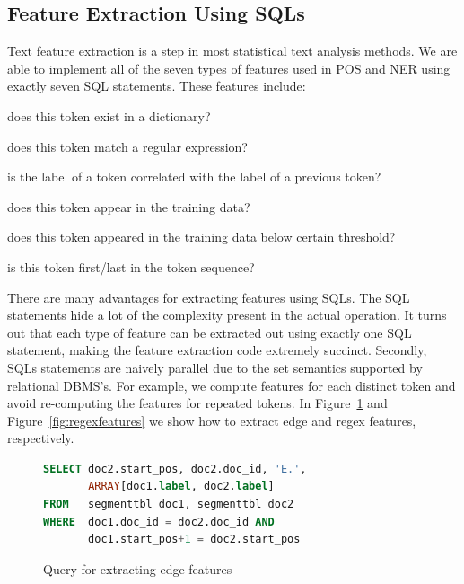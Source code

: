 \documentclass[11pt,letterpaper]{article}
\begin{document}
\subsection{Feature Extraction Using SQLs}
Text feature extraction is a step in most statistical text analysis methods.
We are able to implement all of the seven types of features used in POS and NER using exactly seven 
SQL statements. These features include: 
\begin{description}[noitemsep]
\item[Dictionary:] does this token exist in a dictionary? 
\item[Regex:] does this token match a regular expression? 
\item[Edge:] is the label of a token correlated with the label of a previous token? 
\item[Word:] does this token appear in the training data?
\item[Unknown:] does this token appeared in the training data below certain threshold? 
\item[Start/End:] is this token first/last in the token sequence?
\end{description}

There are many advantages for extracting features using SQLs.  
The SQL statements hide a lot of the complexity  present  in the actual operation.
It turns out that each type of feature can be extracted out using exactly one SQL statement, 
making the feature extraction code extremely succinct.  
Secondly, SQLs statements are naively parallel due to the set semantics supported by relational DBMS's.
For example, we compute features for each distinct token and avoid re-computing the features for repeated tokens.  
In Figure~\ref{fig:edgefeatures} and Figure~\ref{fig:regexfeatures} we show how to extract edge
and regex features, respectively.

\begin{figure}
\centering
\begin{lstlisting}[language=SQL,breaklines=true]
SELECT doc2.start_pos, doc2.doc_id, 'E.', 
       ARRAY[doc1.label, doc2.label]
FROM   segmenttbl doc1, segmenttbl doc2
WHERE  doc1.doc_id = doc2.doc_id AND 
       doc1.start_pos+1 = doc2.start_pos
\end{lstlisting}
\caption{Query for extracting edge features}
\label{fig:edgefeatures}
\end{figure}
\end{document}
